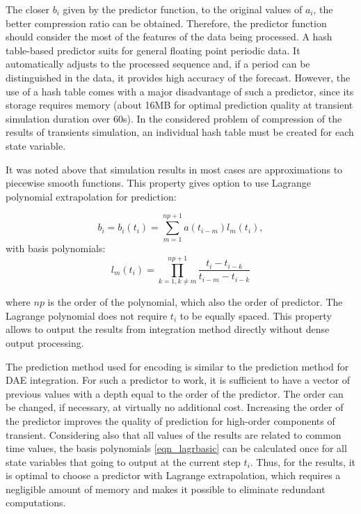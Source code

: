 \documentclass[lettersize,journal]{IEEEtran}
\begin{document}
The closer \(b_i\) given by the predictor function, to the original values of \(a_i\), the better compression ratio can be obtained. 
Therefore, the predictor function should consider the most of the features of the data being processed. 
A hash table-based predictor suits for general floating point periodic data. It automatically adjusts to the processed sequence and, if a period can be distinguished in the data, it provides high accuracy of the forecast. 
However, the use of a hash table comes with a major disadvantage of such a predictor, since 
its storage requires memory (about 16MB for optimal prediction quality at transient simulation duration over 60s). 
In the considered problem of compression of the results of transients simulation, an individual hash table must be created for each state variable.

It was noted above that simulation results  in most cases are approximations to piecewise smooth functions.
This property gives option to use Lagrange polynomial extrapolation for prediction:

\begin{equation}
	\label{eqn_lagrb}
	b_i=b_i(t_i)=\sum_{m=1}^{np+1} a(t_{i-m})l_m(t_i),
\end{equation}
\noindent with basis polynomials:
\begin{equation}
	\label{eqn_lagrbasic}
	l_m(t_i)=\prod_{k=1, k \neq m}^{np+1} \frac{t_i-t_{i-k}}{t_{i-m}-t_{i-k}}
\end{equation}

\noindent where \(np\) is the order of the polynomial, which also the order of predictor. 
The Lagrange polynomial does not require \(t_i\) to be equally spaced. This property allows to output
the results from integration method directly without dense output processing.

The prediction method used for encoding is similar to the prediction method for DAE integration. 
For such a predictor to work, it is sufficient to have a vector of previous values with a depth equal to the order of the predictor. 
The order can be changed, if necessary, at virtually no additional cost. 
Increasing the order of the predictor improves the quality of prediction for high-order components of transient. 
Considering also that all values of the results are related to common time values, the basis polynomials \ref{eqn_lagrbasic} can be calculated once 
for all state variables that going to output at the current step \(t_i\). Thus, for the results, it is optimal 
to choose a predictor with Lagrange extrapolation, which requires a negligible amount of memory and makes it possible to eliminate redundant computations.
\end{document}
